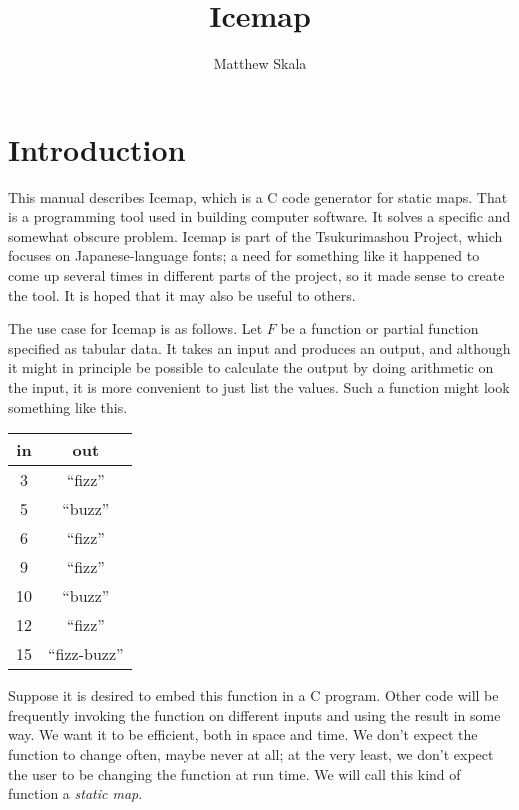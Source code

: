 \documentclass{mitsuba}
\title{Icemap}
\author{Matthew Skala}
\begin{document}
\maketitle

\tableofcontents


\chapter{Introduction}

This manual describes Icemap, which is a C code generator for static maps. 
That is a programming tool used in building computer software.  It solves a
specific and somewhat obscure problem.  Icemap is part of the Tsukurimashou
Project, which focuses on Japanese-language fonts; a need for something like
it happened to come up several times in different parts of the project, so
it made sense to create the tool.  It is hoped that it may also be useful to
others.

The use case for Icemap is as follows.  Let $F$ be a function or partial
function specified as tabular data.  It takes an input and produces an
output, and although it might in principle be possible to calculate the
output by doing arithmetic on the input, it is more convenient to just list
the values.  Such a function might look something like this.

{\hspace*{\fill}\begin{tabular}{c|c}
  in & out \\ \hline
  3 & ``fizz'' \\
  5 & ``buzz'' \\
  6 & ``fizz'' \\
  9 & ``fizz'' \\
  10 & ``buzz'' \\
  12 & ``fizz'' \\
  15 & ``fizz-buzz''
\end{tabular}\hspace*{\fill}\par}

Suppose it is desired to embed this function in a C program.  Other code
will be frequently invoking the function on different inputs and using the
result in some way.  We want it to be efficient, both in space and time.  We
don't expect the function to change often, maybe never at all; at the very
least, we don't expect the user to be changing the function at run time.  We
will call this kind of function a \emph{static map}. 
\end{document}
